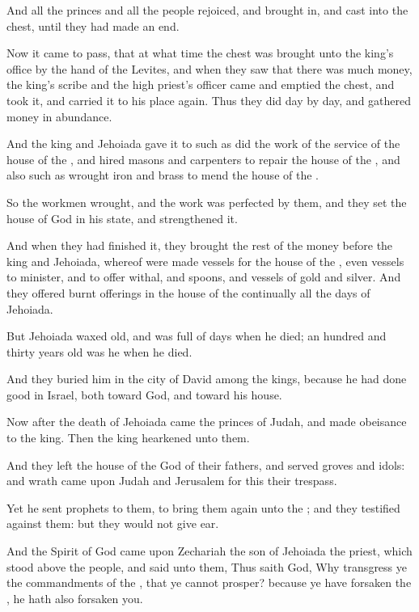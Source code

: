 \verse And all the princes and all the people rejoiced, and brought in, and cast into the chest, until they had made an end.

\verse Now it came to pass, that at what time the chest was brought unto the king's office by the hand of the Levites, and when they saw that there was much money, the king's scribe and the high priest's officer came and emptied the chest, and took it, and carried it to his place again. Thus they did day by day, and gathered money in abundance.

\verse And the king and Jehoiada gave it to such as did the work of the service of the house of the \LORD, and hired masons and carpenters to repair the house of the \LORD, and also such as wrought iron and brass to mend the house of the \LORD.

\verse So the workmen wrought, and the work was perfected by them, and they set the house of God in his state, and strengthened it.

\verse And when they had finished it, they brought the rest of the money before the king and Jehoiada, whereof were made vessels for the house of the \LORD, even vessels to minister, and to offer withal, and spoons, and vessels of gold and silver. And they offered burnt offerings in the house of the \LORD continually all the days of Jehoiada.

\verse But Jehoiada waxed old, and was full of days when he died; an hundred and thirty years old was he when he died.

\verse And they buried him in the city of David among the kings, because he had done good in Israel, both toward God, and toward his house.

\verse Now after the death of Jehoiada came the princes of Judah, and made obeisance to the king. Then the king hearkened unto them.

\verse And they left the house of the \LORD God of their fathers, and served groves and idols: and wrath came upon Judah and Jerusalem for this their trespass.

\verse Yet he sent prophets to them, to bring them again unto the \LORD; and they testified against them: but they would not give ear.

\verse And the Spirit of God came upon Zechariah the son of Jehoiada the priest, which stood above the people, and said unto them, Thus saith God, Why transgress ye the commandments of the \LORD, that ye cannot prosper? because ye have forsaken the \LORD, he hath also forsaken you.

